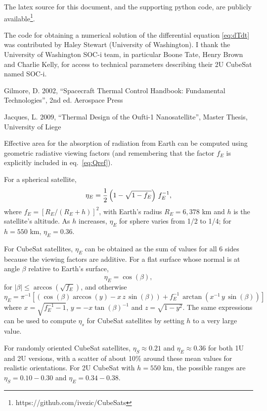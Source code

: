 \documentclass[]{aastex62}
\def\eq#1{\begin{equation} #1 \end{equation}}
\begin{document}
The latex source for this document, and the supporting python code, are publicly 
available\footnote{https://github.com/ivezic/CubeSats}. 


\vskip 0.2in 
{} 
The code for obtaining a numerical solution of the differential equation \ref{eq:dTdt} was contributed by 
Haley Stewart (University of Washington). I thank the University of Washington SOC-i team, in particular 
Boone Tate, Henry Brown and Charlie Kelly, for access to technical parameters describing their 2U CubeSat 
named SOC-i. 
 
%
%

\vskip 0.2in 
Gilmore, D. 2002, ``Spacecraft Thermal Control Handbook: Fundamental Technologies'', 2nd ed. Aerospace Press 

Jacques, L. 2009, ``Thermal Design of the Oufti-1 Nanosatellite'', Master Thesis, University of Liege


\newpage
\appendix{}

\vskip 0.2in

\vskip 0.1in
 Effective area for the absorption of radiation from Earth can be computed using geometric radiative viewing factors
(and remembering that the factor $f_E$ is explicitly included in eq.~\ref{eq:Qref}). 

For a spherical satellite, 
\eq{
                  \eta_E  =  {1\over 2}  \left(1 - \sqrt{1- f_E} \right) \, f_E^{-1},
} 
where $f_E=[R_E/(R_E+h)]^2$, with Earth's radius $R_E=6,378$ km and $h$ is the satellite's altitude. As $h$
increases, $\eta_E$ for sphere varies from 1/2 to 1/4; for $h=550$ km, $\eta_E=0.36$.

For CubeSat satellites, $\eta_E$ can be obtained as the sum of values for all 6 sides because the viewing
factors are additive. For a flat surface whose normal is at angle $\beta$ relative to Earth's surface, 
\eq{
            \eta_E  = \cos(\beta), 
} 
for $|\beta|\le\arccos(\sqrt{f_E})$, and otherwise
\eq{
            \eta_E  = \pi^{-1} \left[ \left( \cos(\beta)\arccos(y) - x \,z \, \sin(\beta) \right) + f_E^{-1} \, \arctan(x^{-1} \, y \, \sin(\beta)) \right] 
} 
where $x=\sqrt{f_E^{-1}-1}$, $y=-x\tan(\beta)^{-1}$ and $z=\sqrt{1-y^2}$. The same expressions can
be used to compute $\eta_s$ for CubeSat satellites by setting $h$ to a very large value. 

For randomly oriented CubeSat satellites, $\eta_S \approx 0.21$ and $\eta_E \approx 0.36$ for both 1U and 2U versions,
with a scatter of about 10\% around these mean values for realistic orientations. For 2U CubeSat
with $h=550$ km, the possible ranges are  $\eta_S = 0.10 - 0.30$ and $\eta_E = 0.34 - 0.38$. 
\end{document}
